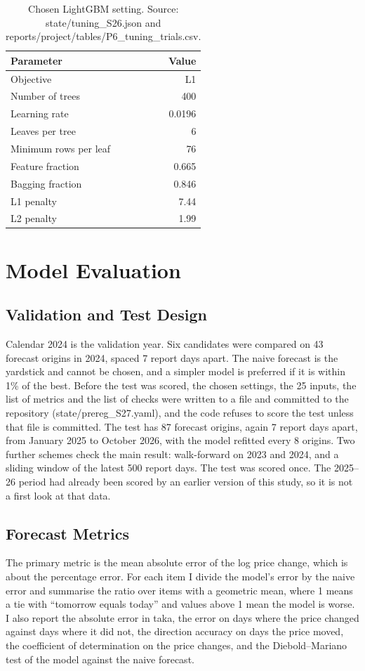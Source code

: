 \documentclass[12pt]{report}
\begin{document}
\begin{table}[H]\centering\small
\caption{Chosen LightGBM setting. Source: state/tuning\_S26.json and reports/project/tables/P6\_tuning\_trials.csv.}\label{tab:params}
\begin{tabular}{|l|r|}
\hline
\textbf{Parameter} & \textbf{Value} \\
\hline
Objective & L1 \\
\hline
Number of trees & 400 \\
\hline
Learning rate & 0.0196 \\
\hline
Leaves per tree & 6 \\
\hline
Minimum rows per leaf & 76 \\
\hline
Feature fraction & 0.665 \\
\hline
Bagging fraction & 0.846 \\
\hline
L1 penalty & 7.44 \\
\hline
L2 penalty & 1.99 \\
\hline
\end{tabular}
\end{table}

\section{Model Evaluation}

\subsection{Validation and Test Design}
Calendar 2024 is the validation year. Six candidates were compared on 43 forecast origins in 2024, spaced 7 report days apart. The naive forecast is the yardstick and cannot be chosen, and a simpler model is preferred if it is within 1\% of the best. Before the test was scored, the chosen settings, the 25 inputs, the list of metrics and the list of checks were written to a file and committed to the repository (state/prereg\_S27.yaml), and the code refuses to score the test unless that file is committed. The test has 87 forecast origins, again 7 report days apart, from January 2025 to October 2026, with the model refitted every 8 origins. Two further schemes check the main result: walk-forward on 2023 and 2024, and a sliding window of the latest 500 report days. The test was scored once. The 2025--26 period had already been scored by an earlier version of this study, so it is not a first look at that data.

\subsection{Forecast Metrics}
The primary metric is the mean absolute error of the log price change, which is about the percentage error. For each item I divide the model's error by the naive error and summarise the ratio over items with a geometric mean, where 1 means a tie with ``tomorrow equals today'' and values above 1 mean the model is worse. I also report the absolute error in taka, the error on days where the price changed against days where it did not, the direction accuracy on days the price moved, the coefficient of determination on the price changes, and the Diebold--Mariano test of the model against the naive forecast.
\end{document}
